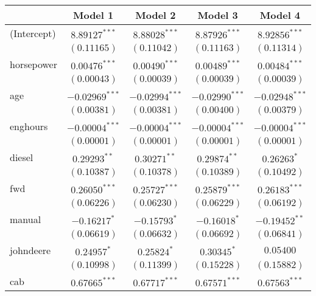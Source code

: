 
\begin{table}
\begin{center}
\begin{tabular}{l c c c c}
\hline
 & Model 1 & Model 2 & Model 3 & Model 4 \\
\hline
(Intercept)          & $8.89127^{***}$  & $8.88028^{***}$  & $8.87926^{***}$  & $8.92856^{***}$  \\
                     & $(0.11165)$      & $(0.11042)$      & $(0.11163)$      & $(0.11314)$      \\
horsepower           & $0.00476^{***}$  & $0.00490^{***}$  & $0.00489^{***}$  & $0.00484^{***}$  \\
                     & $(0.00043)$      & $(0.00039)$      & $(0.00039)$      & $(0.00039)$      \\
age                  & $-0.02969^{***}$ & $-0.02994^{***}$ & $-0.02990^{***}$ & $-0.02948^{***}$ \\
                     & $(0.00381)$      & $(0.00381)$      & $(0.00400)$      & $(0.00379)$      \\
enghours             & $-0.00004^{***}$ & $-0.00004^{***}$ & $-0.00004^{***}$ & $-0.00004^{***}$ \\
                     & $(0.00001)$      & $(0.00001)$      & $(0.00001)$      & $(0.00001)$      \\
diesel               & $0.29293^{**}$   & $0.30271^{**}$   & $0.29874^{**}$   & $0.26263^{*}$    \\
                     & $(0.10387)$      & $(0.10378)$      & $(0.10389)$      & $(0.10492)$      \\
fwd                  & $0.26050^{***}$  & $0.25727^{***}$  & $0.25879^{***}$  & $0.26183^{***}$  \\
                     & $(0.06226)$      & $(0.06230)$      & $(0.06229)$      & $(0.06192)$      \\
manual               & $-0.16217^{*}$   & $-0.15793^{*}$   & $-0.16018^{*}$   & $-0.19452^{**}$  \\
                     & $(0.06619)$      & $(0.06632)$      & $(0.06692)$      & $(0.06841)$      \\
johndeere            & $0.24957^{*}$    & $0.25824^{*}$    & $0.30345^{*}$    & $0.05400$        \\
                     & $(0.10998)$      & $(0.11399)$      & $(0.15228)$      & $(0.15882)$      \\
cab                  & $0.67665^{***}$  & $0.67717^{***}$  & $0.67571^{***}$  & $0.67563^{***}$  \\

\end{tabular}
\end{center}
\end{table}
